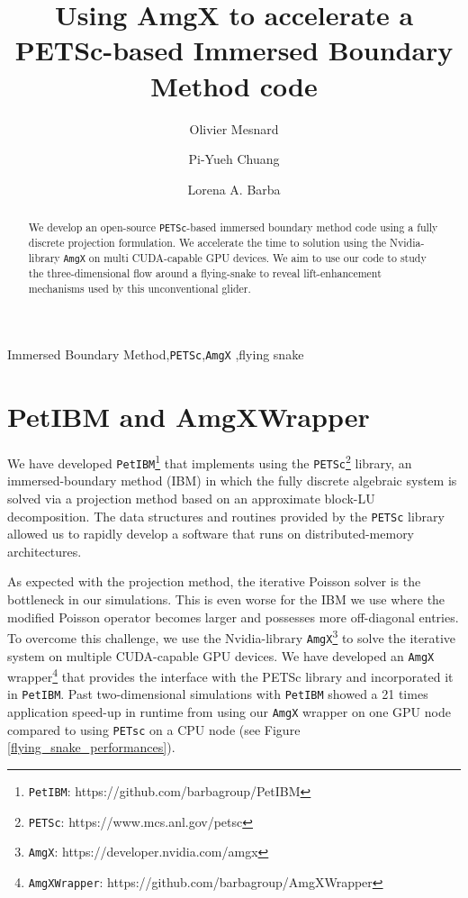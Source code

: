 \documentclass[review]{elsarticle}
\begin{document}
\begin{frontmatter}

\title{Using AmgX to accelerate a PETSc-based Immersed Boundary Method code}

\address[gwu]{Mechanical and Aerospace Engineering, The George Washington University, \\
Washington, DC, 20052, United-States}
\author[gwu]{Olivier Mesnard}
\author[gwu]{Pi-Yueh Chuang}
\author[gwu]{Lorena A. Barba}


\begin{abstract}
We develop an open-source \texttt{PETSc}-based immersed boundary method code using a fully discrete projection formulation. We accelerate the time to solution using the Nvidia-library \texttt{AmgX} on multi CUDA-capable GPU devices. We aim to use our code to study the three-dimensional flow around a  flying-snake to reveal lift-enhancement mechanisms used by this unconventional glider.
\end{abstract}

\begin{keyword}
Immersed Boundary Method\sep \texttt{PETSc}\sep \texttt{AmgX} \sep flying snake
\end{keyword}

\end{frontmatter}

\linenumbers

\section{PetIBM and AmgXWrapper}

We have developed \texttt{PetIBM}\footnote{\texttt{PetIBM}: https://github.com/barbagroup/PetIBM} that implements using the \texttt{PETSc}\footnote{\texttt{PETSc}: https://www.mcs.anl.gov/petsc} library, an immersed-boundary method (IBM) \cite{Taira_Colonius_2007} in which the fully discrete algebraic system is solved via a projection method based on an approximate block-LU decomposition.
The data structures and routines provided by the \texttt{PETSc} library allowed us to rapidly develop a software that runs on distributed-memory architectures.

As expected with the projection method, the iterative Poisson solver is the bottleneck in our simulations.
This is even worse for the IBM we use where the modified Poisson operator becomes larger and possesses more off-diagonal entries.
To overcome this challenge, we use the Nvidia-library \texttt{AmgX}\footnote{\texttt{AmgX}: https://developer.nvidia.com/amgx} to solve the iterative system on multiple CUDA-capable GPU devices.
We have developed an \texttt{AmgX} wrapper\footnote{\texttt{AmgXWrapper}: https://github.com/barbagroup/AmgXWrapper} that provides the interface with the PETSc library and incorporated it in \texttt{PetIBM}.
Past two-dimensional simulations with \texttt{PetIBM} showed a 21 times application speed-up in runtime from using our \texttt{AmgX} wrapper on one GPU node compared to using \texttt{PETsc} on a CPU node (see Figure \ref{flying_snake_performances}).
\end{document}
